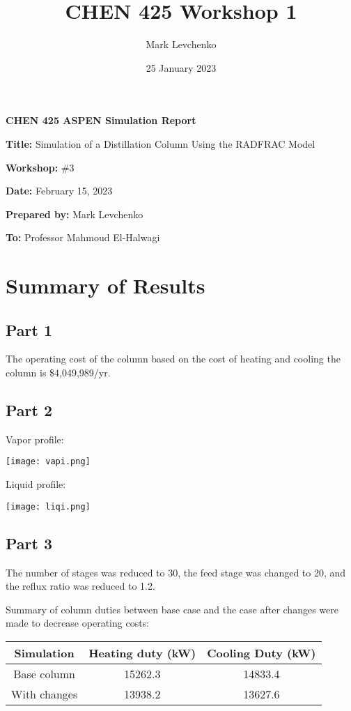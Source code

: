 \documentclass[12pt]{article}
\title{CHEN 425 Workshop 1}
\author{Mark Levchenko}
\date{25 January 2023}
\begin{document}


\textbf{CHEN 425 ASPEN Simulation Report}

\textbf{Title:} Simulation of a Distillation Column Using the RADFRAC Model

\textbf{Workshop:} \#3

\textbf{Date:} February 15, 2023

\textbf{Prepared by:} Mark Levchenko

\textbf{To:} Professor Mahmoud El-Halwagi

\section{Summary of Results}

\subsection{Part 1}

The operating cost of the column based on the cost of heating and cooling the column is \$4,049,989/yr.

\subsection{Part 2}

Vapor profile:

\texttt{[image: vapi.png]}

Liquid profile:

\texttt{[image: liqi.png]}

\subsection{Part 3}

The number of stages was reduced to 30, the feed stage was changed to 20, and the reflux ratio was reduced to 1.2.

Summary of column duties between base case and the case after changes were made to decrease operating costs:

\begin{tabular}{|c|c|c|}
    \hline
    Simulation & Heating duty (kW) & Cooling Duty (kW) \\
    \hline
    Base column & 15262.3 & 14833.4 \\
    With changes & 13938.2 & 13627.6 \\
    \hline
\end{tabular}
\end{document}
